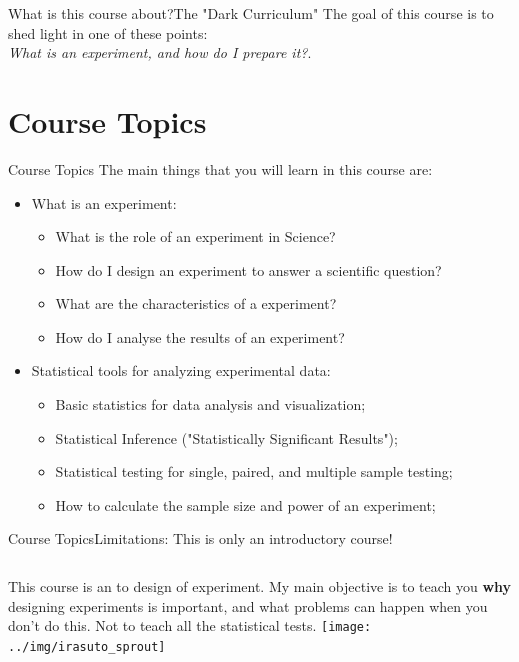 \documentclass{beamer}
\begin{document}
\begin{CJK}{UTF8}{ipxm}
\begin{frame}{What is this course about?}{The "Dark Curriculum"}
  The goal of this course is to shed light in one of these points:\\
  \emph{What is an experiment, and how do I prepare it?}.\bigskip
\end{frame}

\section{Course Topics}
\begin{frame}{Course Topics}
  The main things that you will learn in this course are:\bigskip

  \begin{itemize}
    \item What is an experiment:
    \begin{itemize}
      \item What is the role of an experiment in Science?
      \item How do I design an experiment to answer a scientific question?
      \item What are the characteristics of a  experiment?
      \item How do I analyse the results of an experiment?
    \end{itemize}\bigskip

    \item Statistical tools for analyzing experimental data:
    \begin{itemize}
      \item Basic statistics for data analysis and visualization;
      \item Statistical Inference ("Statistically Significant Results");
      \item Statistical testing for single, paired, and multiple sample testing;
      \item How to calculate the sample size and power of an experiment;
    \end{itemize}
  \end{itemize}
\end{frame}

\begin{frame}{Course Topics}{Limitations: This is only an introductory course!}

  \begin{columns}
    This course is an  to design of experiment. My main objective is to teach you {\bf why} designing experiments is important, and what problems can happen when you don't do this. Not to teach all the statistical tests.
      \texttt{[image: ../img/irasuto\_sprout]}
  \end{columns}
  \vfill


\end{frame}
\end{CJK}
\end{document}
